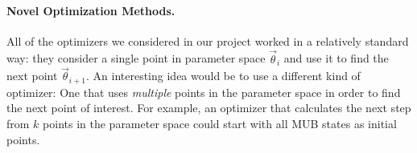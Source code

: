 \documentclass[a4paper,12pt]{article}
\newcommand{\thetas}{\vec{\theta}}
\begin{document}
\paragraph*{Novel Optimization Methods.}

All of the optimizers we considered in our project worked in a relatively standard way: they consider a single point in parameter space $\thetas_i$ and use it to find the next point $\thetas_{i+1}$. An interesting idea would be to use a different kind of optimizer: One that uses \emph{multiple} points in the parameter space in order to find the next point of interest. For example, an optimizer that calculates the next step from $k$ points in the parameter space could start with all MUB states as initial points.
\end{document}
